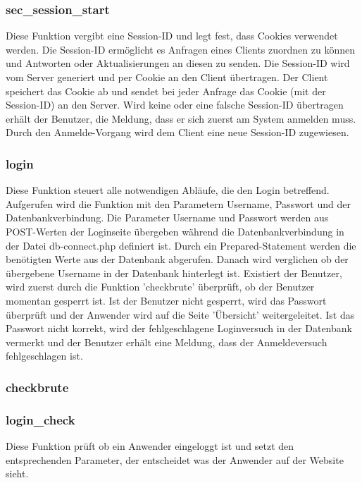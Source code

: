 \subsubsection{sec\_session\_start}
Diese Funktion vergibt eine Session-ID und legt fest, dass Cookies verwendet werden. Die Session-ID ermöglicht es Anfragen eines Clients zuordnen zu können und Antworten oder Aktualisierungen an diesen zu senden. Die Session-ID wird vom Server generiert und per Cookie an den Client übertragen. Der Client speichert das Cookie ab und sendet bei jeder Anfrage das Cookie (mit der Session-ID) an den Server. Wird keine oder eine falsche Session-ID übertragen erhält der Benutzer, die Meldung, dass er sich zuerst am System anmelden muss. Durch den Anmelde-Vorgang wird dem Client eine neue Session-ID zugewiesen.

\subsubsection{login}
Diese Funktion steuert alle notwendigen Abläufe, die den Login betreffend.\\
Aufgerufen wird die Funktion mit den Parametern Username, Passwort und der Datenbankverbindung. Die Parameter Username und Passwort werden aus POST-Werten der Loginseite übergeben während die Datenbankverbindung in der Datei db-connect.php definiert ist. Durch ein Prepared-Statement werden die benötigten Werte aus der Datenbank abgerufen. Danach wird verglichen ob der übergebene Username in der Datenbank hinterlegt ist. Existiert der Benutzer, wird zuerst durch die Funktion 'checkbrute' überprüft, ob der Benutzer momentan gesperrt ist. Ist der Benutzer nicht gesperrt, wird das Passwort überprüft und der Anwender wird auf die Seite 'Übersicht' weitergeleitet. Ist das Passwort nicht korrekt, wird der fehlgeschlagene Loginversuch in der Datenbank vermerkt und der Benutzer erhält eine Meldung, dass der Anmeldeversuch fehlgeschlagen ist. 

\subsubsection{checkbrute}

\subsubsection{login\_check}
Diese Funktion prüft ob ein Anwender eingeloggt ist und setzt den entsprechenden
Parameter, der entscheidet was der Anwender auf der Website sieht.

